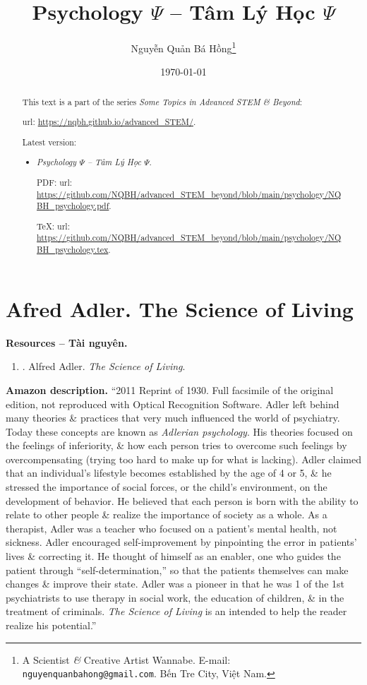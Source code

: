 \documentclass{article}
\title{Psychology $\Psi$ -- Tâm Lý Học $\Psi$}
\author{Nguyễn Quản Bá Hồng\footnote{A Scientist {\it\&} Creative Artist Wannabe. E-mail: {\tt nguyenquanbahong@gmail.com}. Bến Tre City, Việt Nam.}}
\date{\today}
\begin{document}
\maketitle
\begin{abstract}
	This text is a part of the series {\it Some Topics in Advanced STEM \& Beyond}:
	
	{\sc url}: \url{https://nqbh.github.io/advanced_STEM/}.
	
	Latest version:
	\begin{itemize}
		\item {\it Psychology $\Psi$ -- Tâm Lý Học $\Psi$}.
		
		PDF: {\sc url}: \url{https://github.com/NQBH/advanced_STEM_beyond/blob/main/psychology/NQBH_psychology.pdf}.
		
		\TeX: {\sc url}: \url{https://github.com/NQBH/advanced_STEM_beyond/blob/main/psychology/NQBH_psychology.tex}.
	\end{itemize}
\end{abstract}
\tableofcontents


\section{Afred Adler. The Science of Living}
\textbf{\textsf{Resources -- Tài nguyên.}}
\begin{enumerate}
	\item \cite{Adler_science_living}. {\sc Alfred Adler}. {\it The Science of Living}.
\end{enumerate}
\textbf{\textsf{Amazon description.}} ``2011 Reprint of 1930. Full facsimile of the original edition, not reproduced with Optical Recognition Software. Adler left behind many theories \& practices that very much influenced the world of psychiatry. Today these concepts are known as \textit{Adlerian psychology}. His theories focused on the feelings of inferiority, \& how each person tries to overcome such feelings by overcompensating (trying too hard to make up for what is lacking). Adler claimed that an individual's lifestyle becomes established by the age of 4 or 5, \& he stressed the importance of social forces, or the child's environment, on the development of behavior. He believed that each person is born with the ability to relate to other people \& realize the importance of society as a whole. As a therapist, Adler was a teacher who focused on a patient's mental health, not sickness. Adler encouraged self-improvement by pinpointing the error in patients' lives \& correcting it. He thought of himself as an enabler, one who guides the patient through ``self-determination,'' so that the patients themselves can make changes \& improve their state. Adler was a pioneer in that he was 1 of the 1st psychiatrists to use therapy in social work, the education of children, \& in the treatment of criminals. \textit{The Science of Living} is an intended to help the reader realize his potential.''
\end{document}
